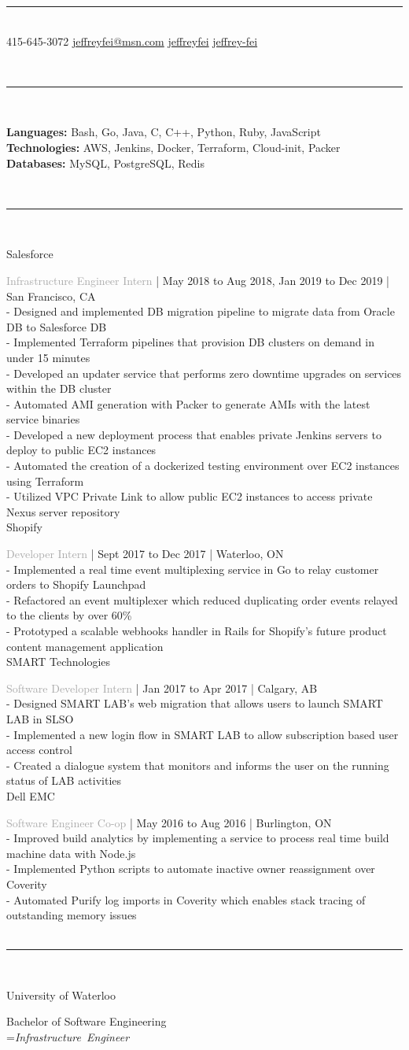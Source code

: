 \documentclass[12pt]{article}
\newcommand{\placetextbox}[3]{%
  \setbox0=\hbox{#3}%
  \AddToShipoutPictureFG*{%
    \put(\LenToUnit{#1\paperwidth},\LenToUnit{#2\paperheight}){\vtop{{\null}\makebox[0pt][c]{#3}}}%
  }%
}%
\newcommand{\cvsection}[1]{
    \\[0.2in]
    \indent \fontsize{18}{18}\selectfont{#1}
    \noindent\rule{\textwidth}{1pt}\\[0.1in]
    \fontsize{12}{15}\selectfont
}
\newcommand{\cmpname}[1]{
    \fontsize{15}{15}\selectfont
    \indent #1 \\[0.03in]
    \fontsize{12}{15}\selectfont
}
\newcommand{\position}[3]{
    \fontsize{12}{15}\selectfont
    \indent \textcolor{darkgray}{#1}
    \fontsize{10}{12}\selectfont
    | #2 | #3 \\[0.04in]
}
\newcommand{\secbullet}[1]{
    \fontsize{12}{15}\selectfont
    \indent - #1\\[0.02in]
}
\newcommand{\secendbullet}[1]{
    \fontsize{12}{15}\selectfont
    \indent - #1\\[0.1in]
}
\newcommand{\cvsubsection}[1]{
    \fontsize{12}{15}\selectfont
    \indent #1\\[0.1in]
}
\begin{document}
\fontsize{33}{33}\selectfont{Jeffrey Fei}
\noindent\rule{\textwidth}{1pt}\\[0.05in]
\fontsize{11}{13}\selectfont
\indent \faPhone\hspace{0.05in} 415-645-3072
\indent \faEnvelope\hspace{0.05in}\href{mailto:jeffreyfei@msn.com}{jeffreyfei@msn.com}
\indent \faGithub\hspace{0.05in}\href{https://github.com/jeffreyfei}{jeffreyfei}
\indent \faLinkedin\hspace{0.05in}\href{https://www.linkedin.com/in/jeffrey-fei/}{jeffrey-fei}
\cvsection{Skills}
\indent \textbf{Languages:} Bash, Go, Java, C, C++, Python, Ruby, JavaScript\\
\indent \textbf{Technologies:} AWS, Jenkins, Docker, Terraform, Cloud-init, Packer\\
\indent \textbf{Databases:} MySQL, PostgreSQL, Redis
\cvsection{Employment}
\cmpname{Salesforce}
\position{Infrastructure Engineer Intern}{May 2018 to Aug 2018, Jan 2019 to Dec 2019}{San Francisco, CA}
\secbullet{Designed and implemented DB migration pipeline to migrate data from Oracle DB to Salesforce DB}
\secbullet{Implemented Terraform pipelines that provision DB clusters on demand in under 15 minutes}
\secbullet{Developed an updater service that performs zero downtime upgrades on services within the DB cluster}
\secbullet{Automated AMI generation with Packer to generate AMIs with the latest service binaries}
\secbullet{Developed a new deployment process that enables private Jenkins servers to deploy to public EC2 instances}
\secbullet{Automated the creation of a dockerized testing environment over EC2 instances using Terraform}
\secendbullet{Utilized VPC Private Link to allow public EC2 instances to access private Nexus server repository}
\cmpname{Shopify}
\position{Developer Intern}{Sept 2017 to Dec 2017}{Waterloo, ON}
\secbullet{Implemented a real time event multiplexing service in Go to relay customer orders to Shopify Launchpad}
\secbullet{Refactored an event multiplexer which reduced duplicating order events relayed to the clients by over 60\%}
\secendbullet{Prototyped a scalable webhooks handler in Rails for Shopify’s future product content management application}
\cmpname{SMART Technologies}
\position{Software Developer Intern}{Jan 2017 to Apr 2017}{Calgary, AB}
\secbullet{Designed SMART LAB's web migration that allows users to launch SMART LAB in SLSO}
\secbullet{Implemented a new login flow in SMART LAB to allow subscription based user access control}
\secendbullet{Created a dialogue system that monitors and informs the user on the running status of LAB activities}
\cmpname{Dell EMC}
\position{Software Engineer Co-op}{May 2016 to Aug 2016}{Burlington, ON}
\secbullet{Improved build analytics by implementing a service to process real time build machine data with Node.js}
\secbullet{Implemented Python scripts to automate inactive owner reassignment over Coverity}
\secbullet{Automated Purify log imports in Coverity which enables stack tracing of outstanding memory issues}
\cvsection{Education}
\cmpname{University of Waterloo}
\cvsubsection{Bachelor of Software Engineering}
\placetextbox{0.86}{0.955}{\fontsize{13}{13}\selectfont \textit{Infrastructure Engineer}}%
\end{document}
